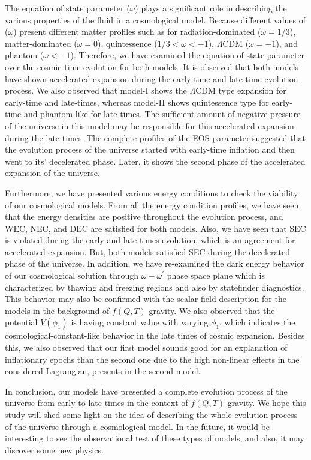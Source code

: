 \documentclass[showpacs,aps,amssymb,preprintnumbers,prd,amsmath,floatfix]{revtex4}
\def \o{\omega}
\begin{document}
The equation of state parameter ($\omega$) plays a significant role in describing the various properties of the fluid in a cosmological model. Because different values of ($\omega$) present different matter profiles such as for radiation-dominated ($\omega=1/3$), matter-dominated ($\omega=0$), quintessence ($1/3<\omega<-1$), $\Lambda$CDM ($\omega=-1$), and phantom ($\omega<-1$). Therefore, we have examined the equation of state parameter over the cosmic time evolution for both models. It is observed that both models have shown accelerated expansion during the early-time and late-time evolution process. We also observed that model-I shows the $\Lambda$CDM type expansion for early-time and late-times, whereas model-II shows quintessence type for early-time and phantom-like for late-times. The sufficient amount of negative pressure of the universe in this model may be responsible for this accelerated expansion during the late-times. The complete profiles of the EOS parameter suggested that the evolution process of the universe started with early-time inflation and then went to its’ decelerated phase. Later, it shows the second phase of the accelerated expansion of the universe.

Furthermore, we have presented various energy conditions to check the viability of our cosmological models. From all the energy condition profiles, we have seen that the energy densities are positive throughout the evolution process, and WEC, NEC, and DEC are satisfied for both models. Also, we have seen that SEC is violated during the early and late-times evolution, which is an agreement for accelerated expansion. But, both models satisfied SEC during the decelerated phase of the universe. In addition, we have re-examined the dark energy behavior of our cosmological solution through $\o-\o^{\prime}$ phase space plane which is characterized by thawing and freezing regions and also by statefinder diagnostics. This behavior may also be confirmed with the scalar field description for the models in the background of $f(Q,T)$ gravity. We also observed that the potential $V(\phi_{1})$ is having constant value with varying $\phi_{1}$, which indicates the cosmological-constant-like behavior in the late times of cosmic expansion. Besides this, we also observed that our first model sounds good for an explanation of inflationary epochs than the second one due to the high non-linear effects in the considered Lagrangian, presents in the second model. 

In conclusion, our models have presented a complete evolution process of the universe from early to late-times in the context of $f(Q,T)$ gravity. We hope this study will shed some light on the idea of describing the whole evolution process of the universe through a cosmological model. In the future, it would be interesting to see the observational test of these types of models, and also, it may discover some new physics. 
 
\end{document}
